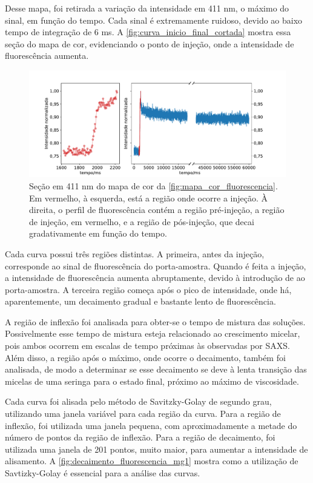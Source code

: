 	Desse mapa, foi retirada a variação da intensidade em 411 nm, o máximo do sinal, em função do tempo. Cada sinal é extremamente ruidoso, devido ao baixo tempo de integração de 6 ms.
	A \autoref{fig:curva_inicio_final_cortada} mostra essa seção do mapa de cor, evidenciando o ponto de injeção, onde a intensidade de fluorescência aumenta.
	
	\begin{figure}[h]
		\centering
		\includegraphics[width=\textwidth]{imagens/fluor/curva_inicio_final_cortada}
		\caption{Seção em 411 nm do mapa de cor da  \autoref{fig:mapa_cor_fluorescencia}. Em vermelho, à esquerda, está a região onde ocorre a injeção. À direita, o perfil de fluorescência contém a região pré-injeção, a região de injeção, em vermelho, e a região de pós-injeção, que decai gradativamente em função do tempo.}
		\label{fig:curva_inicio_final_cortada} 
	\end{figure}
	
	Cada curva possui três regiões distintas. A primeira, antes da injeção, corresponde ao sinal de fluorescência do porta-amostra. Quando é feita a injeção, a intensidade de fluorescência aumenta abruptamente, devido à introdução de \TTAB{} ao porta-amostra. A terceira região começa após o pico de intensidade, onde há, aparentemente, um decaimento gradual e bastante lento de fluorescência.
	
	A região de inflexão foi analisada para obter-se o tempo de mistura das soluções. Possivelmente esse tempo de mistura esteja relacionado ao crescimento micelar, pois ambos ocorrem em escalas de tempo próximas às observadas por SAXS. Além disso, a região após o máximo, onde ocorre o decaimento, também foi analisada, de modo a determinar se esse decaimento se deve à lenta transição das micelas de uma seringa para o estado final, próximo ao máximo de viscosidade. 
	
	Cada curva foi alisada pelo método de Savitzky-Golay de segundo grau, utilizando uma janela variável para cada região da curva. Para a região de inflexão, foi utilizada uma janela pequena, com aproximadamente a metade do número de pontos da região de inflexão. Para a região de decaimento, foi utilizada uma janela de 201 pontos, muito maior, para aumentar a intensidade de alisamento. A \autoref{fig:decaimento_fluorescencia_mg1} mostra como a utilização de Savtizky-Golay é essencial para a análise das curvas. 

